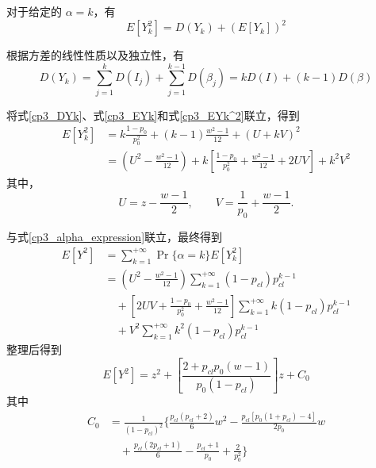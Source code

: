 \begin{enumerate}[wide]
    对于给定的 $\alpha=k$，有
    \begin{equation}\label{cp3_EYk^2}
        E[Y_k^2] = D(Y_k) + (E[Y_k])^2
    \end{equation}

    根据方差的线性性质以及独立性，有
    \begin{equation}\label{cp3_DYk}
        D(Y_k) = \sum_{j=1}^{k} D(I_j) + \sum_{j=1}^{k-1} D(\beta_j) = k D(I) + (k-1) D(\beta)
    \end{equation}

    将式\eqref{cp3_DYk}、式\eqref{cp3_EYk}和式\eqref{cp3_EYk^2}联立，得到
    \begin{equation}\label{cp3_EYK^2_withAB}
        \begin{aligned}
            E[Y_k^2] &= k \frac{1-p_0}{p_0^2} + (k-1)\frac{w^2-1}{12} + (U + kV)^2 \\
            &= \left( U^2 - \frac{w^2-1}{12} \right) + k \left[ \frac{1-p_0}{p_0^2} + \frac{w^2-1}{12} + 2UV \right] + k^2 V^2
        \end{aligned}
    \end{equation}
    其中，
    \[
    U=z-\frac{w-1}{2},\qquad V=\frac{1}{p_0}+\frac{w-1}{2}.
    \]

    与式\eqref{cp3_alpha_expression}联立，最终得到
    \begin{equation}\label{cp3_EY2}
        \begin{aligned}
            E[Y^2] &= \sum_{k=1}^{+\infty} \Pr\{\alpha=k\} E[Y_k^2] \\
            &= \left( U^2 - \frac{w^2-1}{12} \right) \sum_{k=1}^{+\infty}(1-p_{cl})p_{cl}^{k-1} \\
            &\quad + \left[ 2UV + \frac{1-p_0}{p_0^2} + \frac{w^2-1}{12} \right] \sum_{k=1}^{+\infty} k(1-p_{cl})p_{cl}^{k-1} \\
            &\quad + V^2 \sum_{k=1}^{+\infty} k^2(1-p_{cl})p_{cl}^{k-1}
        \end{aligned}
    \end{equation}
    整理后得到
    \begin{equation}\label{cp3_EY2result}
        E[Y^2] = z^2 + \left[ \frac{2 + p_{cl} p_0 (w-1)}{p_0 (1-p_{cl})} \right] z + C_0
    \end{equation}
    其中
    \begin{equation*}
        \begin{split}
            C_0 &= \frac{1}{(1-p_{cl})^2} \Bigg\{ \frac{p_{cl}(p_{cl}+2)}{6} w^2 - \frac{p_{cl} [ p_0(1+p_{cl}) - 4 ]}{2 p_0} w \\
                &\quad + \frac{p_{cl}(2p_{cl}+1)}{6} - \frac{p_{cl}+1}{p_0} + \frac{2}{p_0^2} \Bigg\}
        \end{split}
    \end{equation*}
\end{enumerate}


